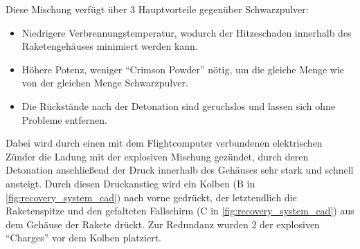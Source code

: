Diese Mischung verfügt über 3 Hauptvorteile gegenüber Schwarzpulver:
\begin{itemize}
    \item Niedrigere Verbrennungstemperatur, wodurch der Hitzeschaden innerhalb des Raketengehäuses minimiert werden kann.
    \item Höhere Potenz, weniger "`Crimson Powder"' nötig, um die gleiche Menge wie von der gleichen Menge Schwarzpulver.
    \item Die Rückstände nach der Detonation sind geruchslos und lassen sich ohne Probleme entfernen.
\end{itemize}   
Dabei wird durch einen mit dem Flightcomputer verbundenen elektrischen Zünder die Ladung mit der explosiven Mischung gezündet, durch deren Detonation anschließend der Druck innerhalb des Gehäuses sehr stark und schnell ansteigt. Durch diesen Druckanstieg wird ein Kolben (B in \ref{fig:recovery_system_cad}) nach vorne gedrückt, der letztendlich die Raketenspitze und den gefalteten Fallschirm (C in \ref{fig:recovery_system_cad}) aus dem Gehäuse der Rakete drückt. Zur Redundanz wurden 2 der explosiven "`Charges"' vor dem Kolben platziert.

